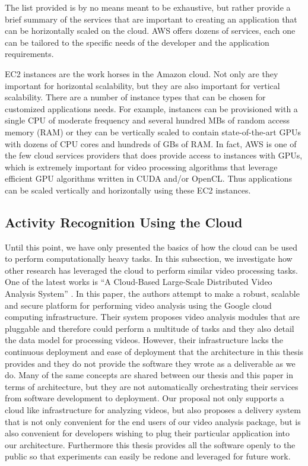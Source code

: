 The list provided is by no means meant to be exhaustive, but rather provide
a brief summary of the services that are important to creating an application
that can be horizontally scaled on the cloud. AWS offers dozens of services, each
one can be tailored to the specific needs of the developer and the application
requirements.

EC2 instances are the work horses in the Amazon cloud. Not only are they important
for horizontal scalability, but they are also important for vertical scalability.
There are a number of instance types that can be chosen for customized
applications needs. For example, instances can be provisioned with a single CPU
of moderate frequency and several hundred MBs of random access memory (RAM) or
they can be vertically scaled to contain state-of-the-art GPUs with dozens of
CPU cores and hundreds of GBs of RAM. In fact, AWS is one of the few cloud
services providers that does provide access to instances with GPUs, which is
extremely important for video processing algorithms that leverage efficient
GPU algorithms written in CUDA and/or OpenCL. Thus applications can be scaled
vertically and horizontally using these EC2 instances.

\subsection{\label{subsection:activity_in_the_cloud}Activity Recognition Using the Cloud}
Until this point, we have only presented the basics of how the cloud can be used
to perform computationally heavy tasks. In this subsection, we investigate how
other research has leveraged the cloud to perform similar video processing tasks.
One of the latest works is ``A Cloud-Based Large-Scale Distributed Video Analysis
System'' \cite{wang2016cloud}. In this paper, the authors attempt to make a
robust, scalable and secure platform for performing video analysis using the
Google cloud computing infrastructure. Their system proposes video analysis
modules that are pluggable and therefore could perform a multitude of tasks and
they also detail the data model for processing videos. However, their infrastructure
lacks the continuous deployment and ease of deployment that the architecture
in this thesis provides and they do not provide the software they wrote as a
deliverable as we do. Many of the same concepts are shared between our thesis
and this paper in terms of architecture, but they are not automatically
orchestrating their services from software development to deployment. Our proposal
not only supports a cloud like infrastructure for analyzing videos, but also proposes
a delivery system that is not only convenient for the end users of our video analysis
package, but is also convenient for developers wishing to plug their particular
application into our architecture. Furthermore this thesis provides all the
software openly to the public so that experiments can easily be redone and leveraged
for future work.

